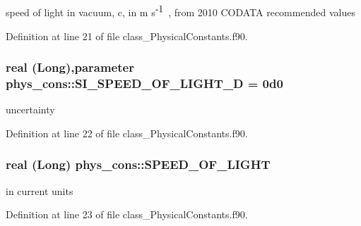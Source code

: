 speed of light in vacuum, c, in m s$^{\mbox{-\/1}}$ , from 2010 CODATA recommended values 



Definition at line 21 of file class\_\-PhysicalConstants.f90.

\hypertarget{namespacephys__cons_a5547546b06eb8853e52e304b25cc7596}{
\subsubsection[{SI\_\-SPEED\_\-OF\_\-LIGHT\_\-D}]{\setlength{\rightskip}{0pt plus 5cm}real (Long),parameter {\bf phys\_\-cons::SI\_\-SPEED\_\-OF\_\-LIGHT\_\-D} = 0d0}}
\label{namespacephys__cons_a5547546b06eb8853e52e304b25cc7596}


uncertainty 



Definition at line 22 of file class\_\-PhysicalConstants.f90.

\hypertarget{namespacephys__cons_ac31faa4bb5e82aecbdffa3b3d43a1736}{
\subsubsection[{SPEED\_\-OF\_\-LIGHT}]{\setlength{\rightskip}{0pt plus 5cm}real (Long) {\bf phys\_\-cons::SPEED\_\-OF\_\-LIGHT}}}
\label{namespacephys__cons_ac31faa4bb5e82aecbdffa3b3d43a1736}


in current units 



Definition at line 23 of file class\_\-PhysicalConstants.f90.

